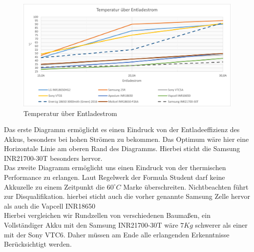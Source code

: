 \begin{figure}[h]
	\centering
	\includegraphics[width=0.6\linewidth]{bilder/Temperatur_ueber_Entladestrom}
	\caption{Temperatur über Entladestrom}
	\label{fig:Temperatur_ueber_Entladestrom}
\end{figure}

Das erste Diagramm ermöglicht es einen Eindruck von der Entladeeffizienz des Akkus, besonders bei hohen Strömen zu bekommen. Das Optimum wäre hier eine Horizontale Linie am oberen Rand des Diagramms. Hierbei sticht die Samsung INR21700-30T besonders hervor.\\
Das zweite Diagramm ermöglicht uns einen Eindruck von der thermischen Performance zu erlangen. Laut Regelwerk der Formula Student darf keine Akkuzelle zu einem Zeitpunkt die \ensuremath{60^\circ C} Marke überschreiten. Nichtbeachten führt zur Disqualifikation. hierbei sticht auch die vorher genannte Samsung Zelle hervor als auch die Vapcell INR18650\\
Hierbei vergleichen wir Rundzellen von verschiedenen Baumaßen, ein Vollständiger Akku mit den Samsung INR21700-30T wäre \ensuremath{7Kg} schwerer als einer mit der Sony VTC6. Daher müssen am Ende alle erlangenden Erkenntnisse Berücksichtigt werden.

\FloatBarrier
